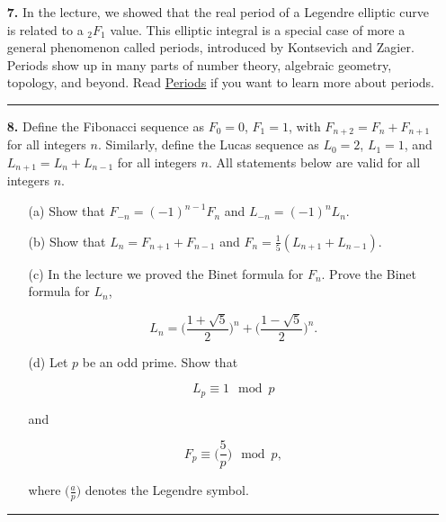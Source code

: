 \documentclass[12pt]{amsart}
\theoremstyle{definition}
\theoremstyle{remark}
\numberwithin{equation}{section}
\begin{document}
\begin{itemize}
\hrule{}

\vspace{8mm}

\item[\textbf{7.}] In the lecture, we showed that the real period of a Legendre elliptic curve is related to a $_{2}F_{1}$ value. This elliptic integral is a special case of more a general phenomenon called periods, introduced by Kontsevich and Zagier. Periods show up in many parts of number theory, algebraic geometry, topology, and beyond. Read \underline{\href{https://www.maths.ed.ac.uk/~v1ranick/papers/kontzagi.pdf}{Periods}} if you want to learn more about periods.

\vspace{4mm}

\hrule{}

\vspace{8mm}

\item[\textbf{8.}] Define the Fibonacci sequence as $F_{0} = 0$, $F_{1} = 1$, with $F_{n+2} = F_{n} + F_{n+1}$ for all integers $n$. Similarly, define the Lucas sequence as $L_{0} = 2$, $L_{1} = 1$, and $L_{n+1} = L_{n} + L_{n-1}$ for all integers $n$. All statements below are valid for all integers $n$.

\vspace{5mm}

\begin{itemize}
    \item[(a)] Show that $F_{-n} = (-1)^{n-1}F_{n}$ and $L_{-n} = (-1)^{n} L_{n}$.

    \vspace{3mm}

    \item[(b)] Show that $L_{n} = F_{n+1} + F_{n-1}$ and $F_{n} = \frac{1}{5}(L_{n+1} + L_{n-1})$.

    \vspace{3mm}

    \item[(c)] In the lecture we proved the Binet formula for $F_{n}$. Prove the Binet formula for $L_{n}$,

    $$L_{n} = \bigg(\frac{1+\sqrt{5}}{2} \bigg)^{n} + \bigg(\frac{1-\sqrt{5}}{2} \bigg)^{n}.$$

    \vspace{3mm}

    \item[(d)] Let $p$ be an odd prime. Show that 

    $$L_{p} \equiv 1 \mod p$$

    and

    $$F_{p} \equiv \bigg(\frac{5}{p} \bigg) \mod p,$$

    \vspace{4mm}

    where $\big(\frac{a}{p} \big)$ denotes the Legendre symbol.
\end{itemize}

\vspace{4mm}

\hrule{}


\end{itemize}
\end{document}

